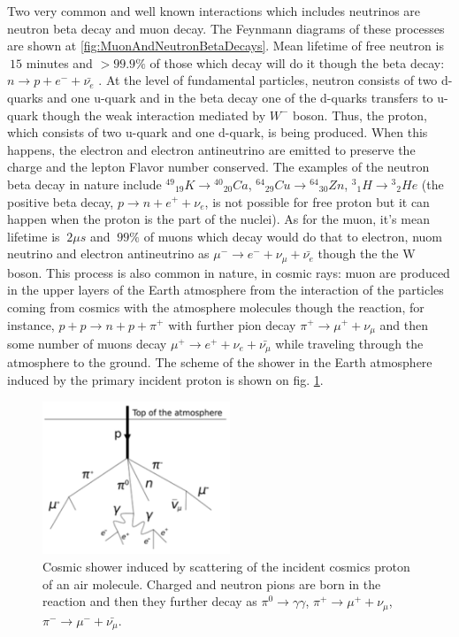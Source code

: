 Two very common and well known interactions which includes neutrinos are neutron beta decay and muon decay. The Feynmann diagrams of these processes are shown at \ref{fig:MuonAndNeutronBetaDecays}. Mean lifetime of free neutron is $~15$ minutes and $>99.9\%$ of those which decay will do it though the beta decay: $n \rightarrow p + e^- + \bar{{\nu}_e} $ \cite{ref_PDG}. At the level of fundamental particles, neutron consists of two d-quarks and one u-quark and in the beta decay one of the d-quarks transfers to u-quark though the weak interaction mediated by $W^- $ boson. Thus, the proton, which consists of two u-quark and one d-quark, is being produced. When this happens, the electron and electron antineutrino are emitted to preserve the charge and the lepton Flavor number conserved. The examples of the neutron beta decay in nature include ${^{49}}{_{19}}K \rightarrow {^{40}}{_{20}}Ca$, ${^{64}}{_{29}}Cu \rightarrow {^{64}}{_{30}}Zn$, ${^3}{_1}H \rightarrow {^3}{_2}He$ \cite{ref_Griffiths} (the positive beta decay,  $p \rightarrow n + e^+ + {\nu}_e $, is not possible for free proton but it can happen when the proton is the part of the nuclei). As for the muon, it's mean lifetime is $~2 {\mu}s$ and $~99\%$ of muons which decay would do that to electron, nuom neutrino and electron antineutrino as ${\mu}^- \rightarrow e^- + {\nu}_{\mu} + \bar{{\nu}_e}$ though the the W boson. This process is also common in nature, in cosmic rays: muon are produced in the upper layers of the Earth atmosphere from the interaction of the particles coming from cosmics with the atmosphere molecules though the reaction, for instance, $p+p \rightarrow n+p+\pi^+$ with further pion decay $\pi^+ \rightarrow \mu^+ + \nu_\mu$ and then some number of muons decay $\mu^+ \rightarrow e^+ + \nu_e + \bar{\nu_\mu}$ while traveling through the atmosphere to the ground. The scheme of the shower in the Earth atmosphere induced by the primary incident proton is shown on fig. \ref{fig:cosmicMuons}.   

\begin{figure}
\caption{Cosmic shower induced by scattering of the incident cosmics proton of an air molecule. Charged and neutron pions are born in the reaction and then they further decay as $\pi^0 \rightarrow \gamma\gamma$, $\pi^+ \rightarrow \mu^+ + \nu_\mu$, $\pi^- \rightarrow \mu^- + \bar{\nu_\mu}$.}
\label{fig:cosmicMuons}
\centering
\includegraphics[width=0.5\textwidth, keepaspectratio=true]{figs/cosmicMuons.png}
\end{figure}

